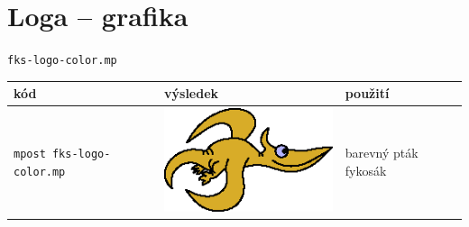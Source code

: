 \documentclass[a4paper,10pt]{article}
\begin{document}
\section{Loga -- grafika}
{\centering\large\texttt{fks-logo-color.mp}\nopagebreak\\\vspace{-12pt}\noindent}
\begin{tabularx}{\textwidth}{|l|l|X|}\hline
    kód & výsledek & použití\\\hline
    \verb+mpost fks-logo-color.mp+&\includegraphics{fks-logo-color}& 
	barevný pták fykosák
{} {} {} {} {} {} {} {} {} {} {} {} {} {} {} {} {} {} {} {} {} {} {} {} {} {} {} {} {} {} {} {} {} {} {} {} {} {} {} {} {} {} {} {} {} {} {} {} {} {} {} {} {} {} {} {} {} {} {} {} {} {} {} {} {} {} {} {} {} {} {} {} {} {} {} {} {} {} {} {} {} {} {} {} {} {} {} {} {} {} {} {} {} {} {} {} {} {} {} {} {} {} {} {} {} {} {} {} {} {} {} {} {} {} {} {} {} {} {} {} {} {} {} {} {} {} {} {}
\\\hline
\end{tabularx}\bigskip
\end{document}
